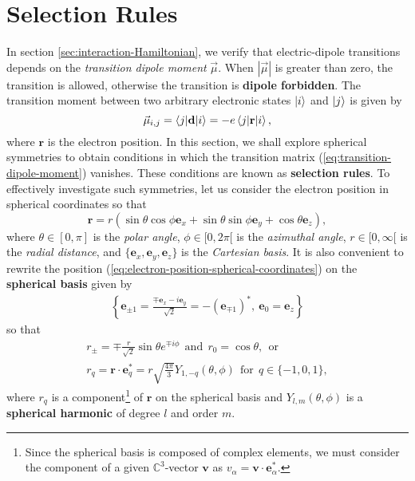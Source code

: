 %
\chapter{Selection Rules}
\label{ap:selection-rules}
%

In section \ref{sec:interaction-Hamiltonian}, we verify that electric-dipole transitions depends on the \textit{transition dipole moment} $ \vec{\mu} $. When $ |\vec{\mu}| $ is greater than zero, the transition is allowed, otherwise the transition is \textbf{dipole forbidden}. The transition moment between two arbitrary electronic states $ \ket{i} $ and $ \ket{j} $ is given by
\begin{equation}
	\vec{\mu}_{i,j} = \braket{j|\mathbf{d}|i} = -e \braket{j|\mathbf{r}|i},
	\label{eq:transition-dipole-moment}
\end{equation}
where $ \mathbf{r} $ is the electron position. In this section, we shall explore spherical symmetries to obtain conditions in which the transition matrix (\ref{eq:transition-dipole-moment}) vanishes. These conditions are known as \textbf{selection rules}. To effectively investigate such symmetries, let us consider the electron position in spherical coordinates so that
\begin{equation}
	\mathbf{r} = r\left(\sin\theta\cos\phi \mathbf{e}_x + \sin\theta\sin\phi \mathbf{e}_y + \cos\theta\mathbf{e}_z\right),
	\label{eq:electron-position-spherical-coordinates}
\end{equation}
where $ \theta \in [0, \pi] $ is the \textit{polar angle}, $ \phi \in [0, 2\pi[ $ is the \textit{azimuthal angle}, $ r \in [0, \infty[ $ is the \textit{radial distance}, and $ \{\mathbf{e}_x, \mathbf{e}_y, \mathbf{e}_z \} $ is the \textit{Cartesian basis}. It is also convenient to rewrite the position (\ref{eq:electron-position-spherical-coordinates}) on the \textbf{spherical basis} given by
\begin{gather}
	\left\{ \mathbf{e}_{\pm1} =  \frac{\mp\mathbf{e}_x - i\mathbf{e}_y}{\sqrt{2}} = -(\mathbf{e}_{\mp 1})^*,\ \mathbf{e}_0 = \mathbf{e}_z\right\}
	\label{eq:spherical-basis}
\end{gather}
so that
\begin{gather}
	r_{\pm} = \mp \frac{r}{\sqrt{2}}\sin\theta e^{\mp i \phi}\ \ \textrm{and}\ \ r_0 = \cos\theta,\ \ \textrm{or}\label{eq:position-vector-spherical-basis-1}
	\\
	r_{q} = \mathbf{r} \cdot \mathbf{e}_q^* = r \sqrt{\frac{4\pi}{3}} Y_{1, -q}(\theta, \phi)\ \ \textrm{for}\ \ q \in \{-1, 0, 1\},
	\label{eq:position-vector-spherical-basis-2}
\end{gather}
where $ r_{q} $ is a component\footnote{Since the spherical basis is composed of complex elements, we must consider the component of a given $\mathbb{C}^3$-vector $ \mathbf{v} $ as $ v_\alpha = \mathbf{v} \cdot \mathbf{e}_{\alpha}^* $.} of $ \mathbf{r} $ on the spherical basis and $ Y_{l, m}(\theta, \phi) $ is a \textbf{spherical harmonic} of degree $ l $ and order $ m $.

